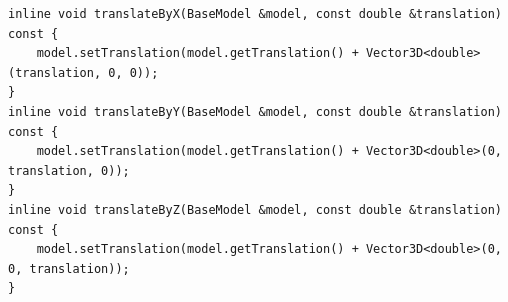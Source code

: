 

\clearpage



\clearpage



\clearpage



\clearpage





\clearpage





\begin{lstlisting}[label=lst:model-move,caption=Реализация афинного преобразования --- перемещение модели]
inline void translateByX(BaseModel &model, const double &translation) const {
	model.setTranslation(model.getTranslation() + Vector3D<double>(translation, 0, 0));
}
inline void translateByY(BaseModel &model, const double &translation) const {
	model.setTranslation(model.getTranslation() + Vector3D<double>(0, translation, 0));
}
inline void translateByZ(BaseModel &model, const double &translation) const {
	model.setTranslation(model.getTranslation() + Vector3D<double>(0, 0, translation));
}
\end{lstlisting}

